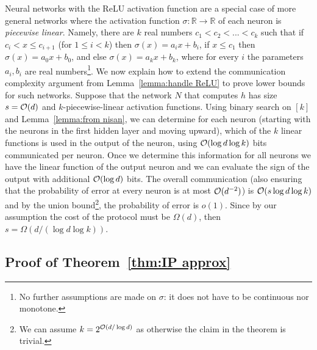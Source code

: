 \documentclass[11pt]{article}
\newcommand{\co}{{\cal O}}
\newcommand{\reals}{{\mathbb R}}
\begin{document}
Neural networks with the ReLU activation function are a special case of more general networks where the activation function $\sigma:\reals \rightarrow \reals$ of each neuron is \emph{piecewise linear}. Namely, there are $k$ real numbers $c_1<c_2<...<c_k$ such that if $c_i < x \leq c_{i+1}$ (for $1 \leq i < k$) then $\sigma(x)=a_ix+b_i$, if $x \leq c_1$ then $\sigma(x)=a_0x+b_0$, and else $\sigma(x)=a_kx+b_k$, where for every $i$ the parameters $a_i,b_i$ are real numbers\footnote{No further assumptions are made on $\sigma$: it does not have to be continuous nor monotone.}. 
We now explain how to extend the communication complexity argument from Lemma~\ref{lemma:handle ReLU} to prove lower bounds for such networks. 
Suppose 
that the network $N$ that computes $h$ has size $s=\co(d)$ and $k$-piecewise-linear activation functions. Using binary search on $[k]$ and Lemma~\ref{lemma:from nisan}, we can determine for each neuron (starting with the neurons in the first hidden layer and moving upward), which of the $k$ linear functions is used in the output of the neuron, using $\co(\log d \log k)$ bits communicated per neuron.
Once we determine this information for all neurons we have the linear function of the output neuron and we can evaluate the sign of the output with additional $\co(\log d)$ bits. The overall communication (also ensuring that the probability of error at every neuron is at most $\co(d^{-2})$) is $\co(s \log d \log k)$ and by the union bound\footnote{We can assume $k=2^{\co(d/\log d)}$ as otherwise the claim in the theorem is trivial.}, the probability of error is $o(1)$. 
Since by our assumption the cost of the protocol must be $\Omega(d)$, then $s=\Omega(d / (\log d \log k))$.


\subsection{Proof of Theorem~\ref{thm:IP approx}}
\label{app:proof of theorem IP approx}
\end{document}
